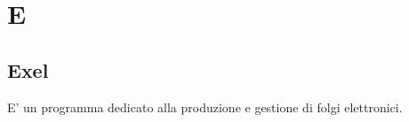\section{E}
\subsection{Exel}
E' un programma dedicato alla produzione e gestione di folgi elettronici.
\clearpage